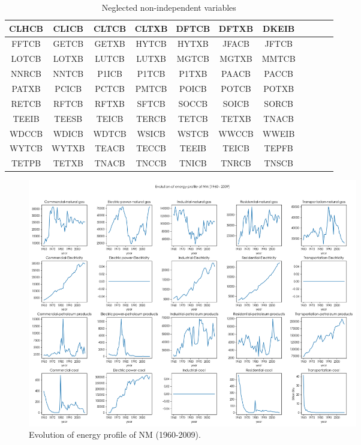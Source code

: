 \documentclass[a4paper,11pt]{article}
\begin{document}
\begin{appendices}
\begin{table}[H]
    \centering
    \begin{tabular}{|c|c|c|c|c|c|c|c|c|c|c|}
        \hline CLHCB & CLICB & CLTCB & CLTXB & DFTCB & DFTXB & DKEIB\\
        \hline FFTCB & GETCB & GETXB & HYTCB & HYTXB & JFACB & JFTCB\\
        \hline LOTCB & LOTXB & LUTCB & LUTXB & MGTCB & MGTXB & MMTCB\\
        \hline NNRCB & NNTCB & P1ICB & P1TCB & P1TXB & PAACB & PACCB\\
        \hline PATXB & PCICB & PCTCB & PMTCB & POICB & POTCB & POTXB\\
        \hline RETCB & RFTCB & RFTXB & SFTCB & SOCCB & SOICB & SORCB\\
        \hline TEEIB & TEESB & TEICB & TERCB & TETCB & TETXB & TNACB\\
        \hline WDCCB & WDICB & WDTCB & WSICB & WSTCB & WWCCB & WWEIB\\
        \hline WYTCB & WYTXB & TEACB & TECCB & TEEIB & TEICB & TEPFB\\
        \hline TETPB & TETXB & TNACB & TNCCB & TNICB & TNRCB & TNSCB\\
        \hline
    \end{tabular}
    \caption{Neglected non-independent variables}
    \label{exclude}
\end{table}



\begin{figure}[h]%
    \centering 
    \includegraphics[width=0.7\textwidth]{./Pic/B-classify-NM.png}
    \caption{Evolution of energy profile of NM (1960-2009).}
    \label{fig:part-2-NM}  
\end{figure}


\end{appendices}
\end{document}
